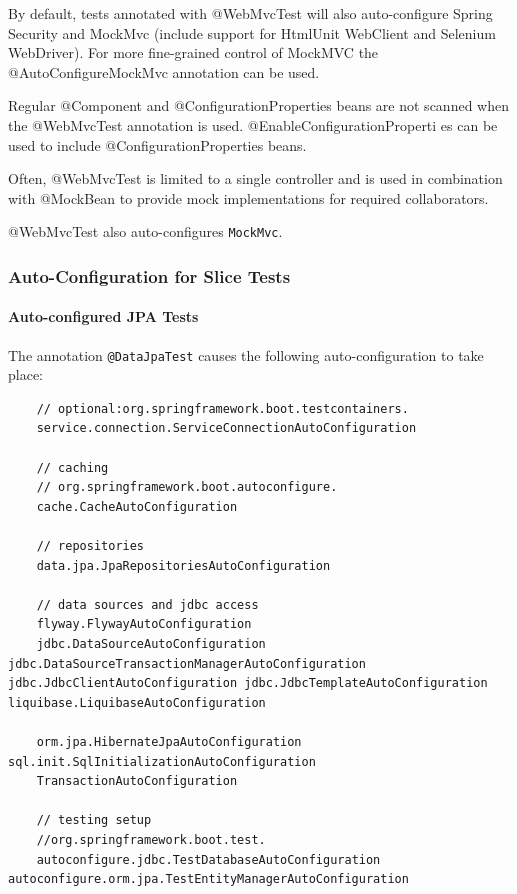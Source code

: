 \documentclass{scrartcl}
\begin{document}
By default, tests annotated with @WebMvcTest will also auto-configure Spring Security and MockMvc (include support for HtmlUnit WebClient and Selenium WebDriver). For more fine-grained control of MockMVC the @AutoConfigureMockMvc annotation can be used.

Regular @Component and @ConfigurationProperties beans are not scanned when the @WebMvcTest annotation is used. @EnableConfigurationProperti es can be used to include @ConfigurationProperties beans.

Often, @WebMvcTest is limited to a single controller and is used in combination with @MockBean to provide mock implementations for required collaborators.

@WebMvcTest also auto-configures \lstinline|MockMvc|.


\subsubsection{Auto-Configuration for Slice Tests}
\paragraph{Auto-configured JPA Tests}

The annotation \lstinline|@DataJpaTest| causes the following auto-configuration to take place:

\begin{lstlisting}
    // optional:org.springframework.boot.testcontainers.
    service.connection.ServiceConnectionAutoConfiguration

    // caching
    // org.springframework.boot.autoconfigure.
    cache.CacheAutoConfiguration

    // repositories
    data.jpa.JpaRepositoriesAutoConfiguration

    // data sources and jdbc access
    flyway.FlywayAutoConfiguration
    jdbc.DataSourceAutoConfiguration jdbc.DataSourceTransactionManagerAutoConfiguration jdbc.JdbcClientAutoConfiguration jdbc.JdbcTemplateAutoConfiguration liquibase.LiquibaseAutoConfiguration

    orm.jpa.HibernateJpaAutoConfiguration sql.init.SqlInitializationAutoConfiguration
    TransactionAutoConfiguration

    // testing setup
    //org.springframework.boot.test.
    autoconfigure.jdbc.TestDatabaseAutoConfiguration autoconfigure.orm.jpa.TestEntityManagerAutoConfiguration

\end{lstlisting}
\end{document}
